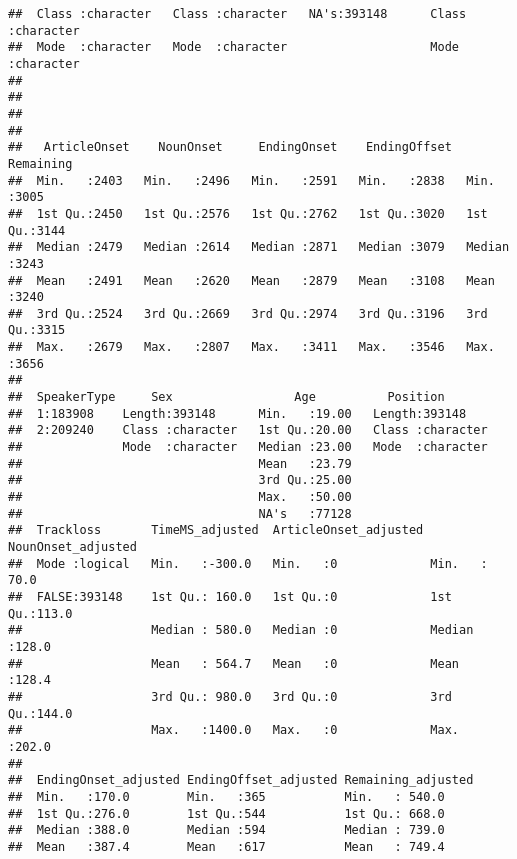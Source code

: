 \documentclass[
]{article}
\begin{document}
\begin{verbatim}
##  Class :character   Class :character   NA's:393148      Class :character  
##  Mode  :character   Mode  :character                    Mode  :character  
##                                                                           
##                                                                           
##                                                                           
##                                                                           
##   ArticleOnset    NounOnset     EndingOnset    EndingOffset    Remaining   
##  Min.   :2403   Min.   :2496   Min.   :2591   Min.   :2838   Min.   :3005  
##  1st Qu.:2450   1st Qu.:2576   1st Qu.:2762   1st Qu.:3020   1st Qu.:3144  
##  Median :2479   Median :2614   Median :2871   Median :3079   Median :3243  
##  Mean   :2491   Mean   :2620   Mean   :2879   Mean   :3108   Mean   :3240  
##  3rd Qu.:2524   3rd Qu.:2669   3rd Qu.:2974   3rd Qu.:3196   3rd Qu.:3315  
##  Max.   :2679   Max.   :2807   Max.   :3411   Max.   :3546   Max.   :3656  
##                                                                            
##  SpeakerType     Sex                 Age          Position        
##  1:183908    Length:393148      Min.   :19.00   Length:393148     
##  2:209240    Class :character   1st Qu.:20.00   Class :character  
##              Mode  :character   Median :23.00   Mode  :character  
##                                 Mean   :23.79                     
##                                 3rd Qu.:25.00                     
##                                 Max.   :50.00                     
##                                 NA's   :77128                     
##  Trackloss       TimeMS_adjusted  ArticleOnset_adjusted NounOnset_adjusted
##  Mode :logical   Min.   :-300.0   Min.   :0             Min.   : 70.0     
##  FALSE:393148    1st Qu.: 160.0   1st Qu.:0             1st Qu.:113.0     
##                  Median : 580.0   Median :0             Median :128.0     
##                  Mean   : 564.7   Mean   :0             Mean   :128.4     
##                  3rd Qu.: 980.0   3rd Qu.:0             3rd Qu.:144.0     
##                  Max.   :1400.0   Max.   :0             Max.   :202.0     
##                                                                           
##  EndingOnset_adjusted EndingOffset_adjusted Remaining_adjusted
##  Min.   :170.0        Min.   :365           Min.   : 540.0    
##  1st Qu.:276.0        1st Qu.:544           1st Qu.: 668.0    
##  Median :388.0        Median :594           Median : 739.0    
##  Mean   :387.4        Mean   :617           Mean   : 749.4    

\end{verbatim}
\end{document}
